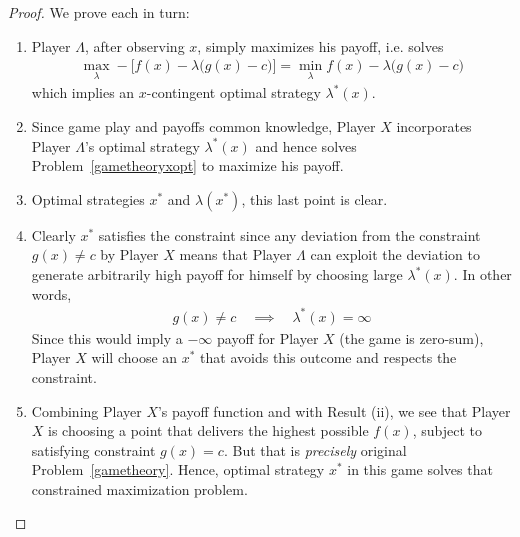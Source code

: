 \documentclass[12pt]{article}
\numberwithin{equation}{section} %
\theoremstyle{plain}
\theoremstyle{definition}
\theoremstyle{remark}
\begin{document}
\begin{proof}
We prove each in turn:
\begin{enumerate}[label=(\roman*)]
  \item
    Player $\Lambda$, after observing $x$, simply maximizes his payoff,
    i.e.  solves
    \begin{align*}
      \max_\lambda -\big[ f(x)-\lambda\big(g(x)-c\big)\big]
      =
      \min_\lambda  f(x)-\lambda\big(g(x)-c\big)
    \end{align*}
    which implies an $x$-contingent optimal strategy $\lambda^*(x)$.
  \item
    Since game play and payoffs common knowledge, Player $X$
    incorporates Player $\Lambda$'s optimal strategy $\lambda^*(x)$ and
    hence solves Problem~\ref{gametheoryxopt} to maximize his payoff.
  \item Optimal strategies $x^*$ and $\lambda(x^*)$, this last point is
    clear.
  \item
    Clearly $x^*$ satisfies the constraint
    since any deviation from the constraint $g(x)\neq c$ by Player $X$
    means that Player $\Lambda$ can exploit the deviation to generate
    arbitrarily high payoff for himself by choosing large
    $\lambda^*(x)$.
    In other words,
    \begin{align*}
      g(x)\neq c
      \quad\implies\quad
      \lambda^*(x)=\infty
    \end{align*}
    Since this would imply a $-\infty$ payoff for Player $X$ (the game
    is zero-sum), Player $X$ will choose an $x^*$ that avoids this
    outcome and respects the constraint.
  \item
    Combining Player $X$'s payoff function and with Result (ii),
    we see that Player $X$ is choosing a point that delivers the highest
    possible $f(x)$, subject to satisfying constraint $g(x)=c$.  But
    that is \emph{precisely} original Problem~\ref{gametheory}.  Hence,
    optimal strategy $x^*$ in this game solves that constrained
    maximization problem.
\end{enumerate}
\end{proof}
\end{document}
